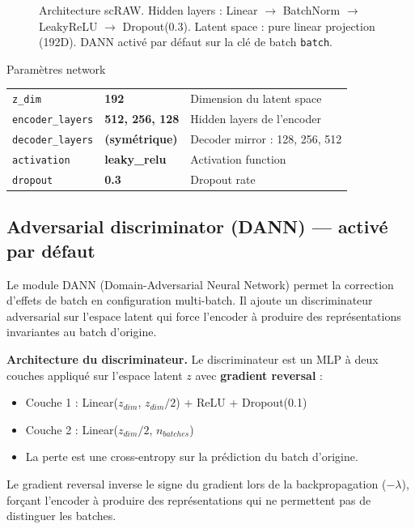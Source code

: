 \documentclass[11pt,a4paper]{article}
\begin{document}
\begin{figure}[H]
{%
}
\caption{Architecture scRAW. Hidden layers : Linear $\to$ BatchNorm $\to$ LeakyReLU $\to$ Dropout(0.3). Latent space : pure linear projection (192D). DANN activ\'e par d\'efaut sur la cl\'e de batch \texttt{batch}.}
\label{fig:architecture}
\end{figure}

\begin{parambox}{Param\`etres network}
\begin{tabular}{lll}
\texttt{z\_dim} & \textbf{192} & Dimension du latent space \\
\texttt{encoder\_layers} & \textbf{512, 256, 128} & Hidden layers de l'encoder \\
\texttt{decoder\_layers} & \textbf{(sym\'etrique)} & Decoder mirror : 128, 256, 512 \\
\texttt{activation} & \textbf{leaky\_relu} & Activation function \\
\texttt{dropout} & \textbf{0.3} & Dropout rate \\
\end{tabular}
\end{parambox}

\subsection{Adversarial discriminator (DANN) --- activ\'e par d\'efaut}
\label{sec:dann_archi}

Le module DANN (Domain-Adversarial Neural Network) permet la correction d'effets de batch en configuration multi-batch. Il ajoute un discriminateur adversarial sur l'espace latent qui force l'encoder \`a produire des repr\'esentations invariantes au batch d'origine.

\textbf{Architecture du discriminateur.} Le discriminateur est un MLP \`a deux couches appliqu\'e sur l'espace latent $z$ avec \textbf{gradient reversal} :
\begin{itemize}[nosep]
  \item Couche 1 : Linear($z_{dim}$, $z_{dim}/2$) + ReLU + Dropout(0.1)
  \item Couche 2 : Linear($z_{dim}/2$, $n_{batches}$)
  \item La perte est une cross-entropy sur la pr\'ediction du batch d'origine.
\end{itemize}
Le gradient reversal inverse le signe du gradient lors de la backpropagation ($-\lambda$), for\c{c}ant l'encoder \`a produire des repr\'esentations qui ne permettent pas de distinguer les batches.
\end{document}
